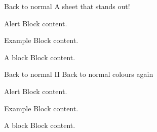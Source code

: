 \documentclass[12pt, dutch]{beamer}
\begin{document}
\begin{frame}{Back to normal}
  A sheet that stands out!
  \begin{alertblock}{Alert}
        Block content.
      \end{alertblock}
      \begin{exampleblock}{Example}
        Block content.
       \end{exampleblock} 
      \begin{block}{A block}
        Block content.
       \end{block}        
\end{frame} 
 
\begin{frame}{Back to normal II}
  Back to normal colours again
  \begin{alertblock}{Alert}
        Block content.
      \end{alertblock}
      \begin{exampleblock}{Example}
        Block content.
       \end{exampleblock} 
      \begin{block}{A block}
        Block content.
       \end{block}        
\end{frame} 

\end{document}
